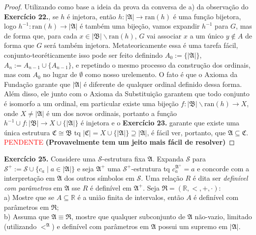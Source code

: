\documentclass[11pt]{article}
\newcommand{\mc}[1]{\mathcal{#1}}
\newcommand{\mf}[1]{\mathfrak{#1}}
\newcommand{\mbb}[1]{\mathbb{#1}}
\begin{document}
\begin{proof}
    Utilizando como base a ideia da prova da conversa de a) da observação do \textbf{Exercício 22.}, se $h$ é injetora, então $h:|\mf{A}|\to\text{ran}(h)$ é uma função bijetora, logo $h^{-1}:\text{ran}(h)\to|\mf{A}|$ é também uma bijeção, vamos expandir $h^{-1}$ para $G$, mas de forma que, para cada $x\in|\mf{B}|\backslash\text{ran}(h)$, $G$ vai associar $x$ a um único $y\notin A$ de forma que $G$ será também injetora. Metateoricamente essa é uma tarefa fácil, conjunto-teoréticamente isso pode ser feito definindo $A_0:=\{|\mf{A}|\}$, $A_n:=A_{n-1}\cup\{A_{n-1}\}$, e repetindo o mesmo processo da construção dos ordinais, mas com $A_0$ no lugar de $\emptyset$ como nosso urelemento. O fato é que o Axioma da Fundação garante que $|\mf{A}|$ é diferente de qualquer ordinal definido dessa forma. Além disso, ele junto com o Axioma da Substituição garantem que todo conjunto é isomorfo a um ordinal, em particular existe uma bijeção $f:|\mf{B}|\backslash\text{ran}(h)\to X$, onde $X\neq|\mf{A}|$ é um dos novos ordinais, portanto a função $h^{-1}\cup f:|\mf{B}|\to X\cup\{|\mf{A}|\}$ é injetora e o \textbf{Exercício 23.} garante que existe uma única estrutura $\mf{C}\cong\mf{B}$ tq $|\mf{C}|=X\cup\{|\mf{A}|\}\supseteq|\mf{A}|$, é fácil ver, portanto, que $\mf{A}\subseteq\mf{C}$.\\
    \textcolor{red}{PENDENTE} \textbf{(Provavelmente tem um jeito mais fácil de resolver)}
\end{proof}

\begin{shaded}
\textbf{Exercício 25.} Considere uma $\mc{S}$-estrutura fixa $\mf{A}$. Expanda $\mc{S}$ para $\mc{S}^+:=\mc{S}\cup\{c_a\mid a\in|\mf{A}|\}$ e seja $\mf{A}^+$ uma $\mc{S}^+$-estrutura tq $c_a^{\mf{A}^+}=a$ e concorde com a interpretação em $\mf{A}$ dos outros símbolos em $\mc{S}$. Uma relação $R$ é dita ser \textit{definível com parâmetros} em $\mf{A}$ sse $R$ é definível em $\mf{A}^+$. Seja $\mf{R}=(\mbb{R},<,+,\cdot)$:\\
a) Mostre que se $A\subseteq\mbb{R}$ é a união finita de intervalos, então $A$ é definível com parâmetros em $\mf{R}$;\\
b) Assuma que $\mf{A}\equiv\mf{R}$, mostre que qualquer subconjunto de $\mf{A}$ não-vazio, limitado (utilizando $<^\mf{A}$) e definível com parâmetros em $\mf{A}$ possui um supremo em $|\mf{A}|$.
\end{shaded}
\end{document}
